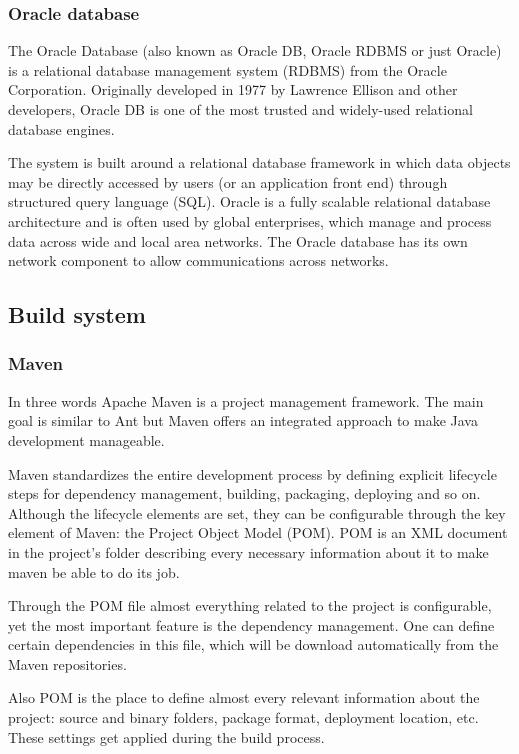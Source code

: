 \subsubsection{Oracle database}
The Oracle Database (also known as Oracle DB, Oracle RDBMS or just Oracle) is a
relational database management system (RDBMS) from the Oracle Corporation.
Originally developed in 1977 by Lawrence Ellison and other developers, Oracle DB
is one of the most trusted and widely-used relational database engines.

The system is built around a relational database framework in which data objects
may be directly accessed by users (or an application front end) through
structured query language (SQL). Oracle is a fully scalable relational database
architecture and is often used by global enterprises, which manage and process
data across wide and local area networks. The Oracle database has its own
network component to allow communications across networks.
\subsection{Build system}

\subsubsection{Maven}
In three words Apache Maven is a project management framework. The main goal is 
similar to Ant but Maven offers an integrated approach to make Java development
manageable. 

Maven standardizes the entire development process by defining explicit lifecycle
steps for dependency management, building, packaging, deploying and so on.
Although the lifecycle elements are set, they can be configurable through the 
key element of Maven: the Project Object Model (POM). POM is an XML document in 
the project's folder describing every necessary information about it to make 
maven be able to do its job. 

Through the POM file almost everything related to the project is configurable,
yet the most important feature is the dependency management. One can define
certain dependencies in this file, which will be download automatically from 
the Maven repositories.

Also POM is the place to define almost every relevant information about the project:
source and binary folders, package format, deployment location, etc. These settings
get applied during the build process.

